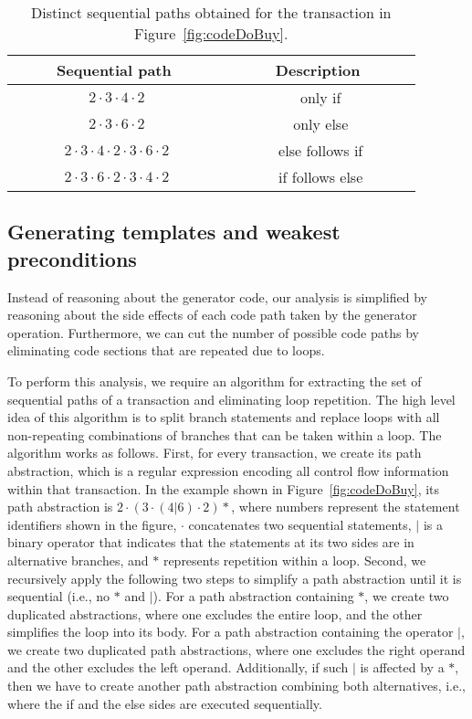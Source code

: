\begin{table}[t]
\centering
\begin{tabular}{|c|c|}
\hline
\ \ \ \ \ Sequential path \ \ \ \ \ & \ \ \ \ \  Description \ \ \ \ \ \\\hline
$2\cdot3\cdot4\cdot2$ & only if\\
$2\cdot3\cdot6\cdot2$ & only else\\
$2\cdot3\cdot4\cdot2\cdot3\cdot6\cdot2$ & else follows if\\
$2\cdot3\cdot6\cdot2\cdot3\cdot4\cdot2$ & if follows else\\
\hline
\end{tabular}
\caption{Distinct sequential paths obtained for the transaction in Figure~\ref{fig:codeDoBuy}\protect{}.}
\label{tab:pathreduce}
\end{table}

\subsection{Generating templates and weakest preconditions}
\label{ch:sieve:sec:label:static}
Instead of reasoning about the generator code, our analysis
is simplified by reasoning about the side effects of each code path
taken by the generator operation. Furthermore, we can cut the number of
possible code paths by eliminating code sections that are repeated due to loops.

To perform this analysis,
we require an algorithm for extracting the set of 
sequential paths of a transaction and eliminating loop repetition.
The high level idea of this algorithm is to split branch statements
and replace loops with all non-repeating combinations of branches that
can be taken within a loop. The algorithm works as follows.
First, for every transaction,
we create its path abstraction, which is a regular expression
encoding all control flow information within
that transaction. In the example shown in Figure~\ref{fig:codeDoBuy}, 
its path abstraction is $2\cdot(3\cdot(4|6)\cdot2)*$, where numbers
represent the statement identifiers shown in the figure, $\cdot$ concatenates two sequential statements,
$|$ is a binary operator that indicates that the statements at its two sides
are in alternative branches, and $*$ represents repetition within a loop.
Second, we recursively apply the following two steps to simplify a path abstraction until 
it is sequential (i.e., no $*$ and $|$). For a path abstraction containing $*$, we create two duplicated
abstractions, where one excludes the entire loop, and the other simplifies the loop into its body.
For a path abstraction containing the operator $|$, we create two duplicated
path abstractions, where one excludes the right operand and the other
excludes the left operand. Additionally, if such $|$ is affected by
a $*$, then we have to create another  path abstraction combining
both alternatives, i.e., where the if and the else sides are executed
sequentially. 


